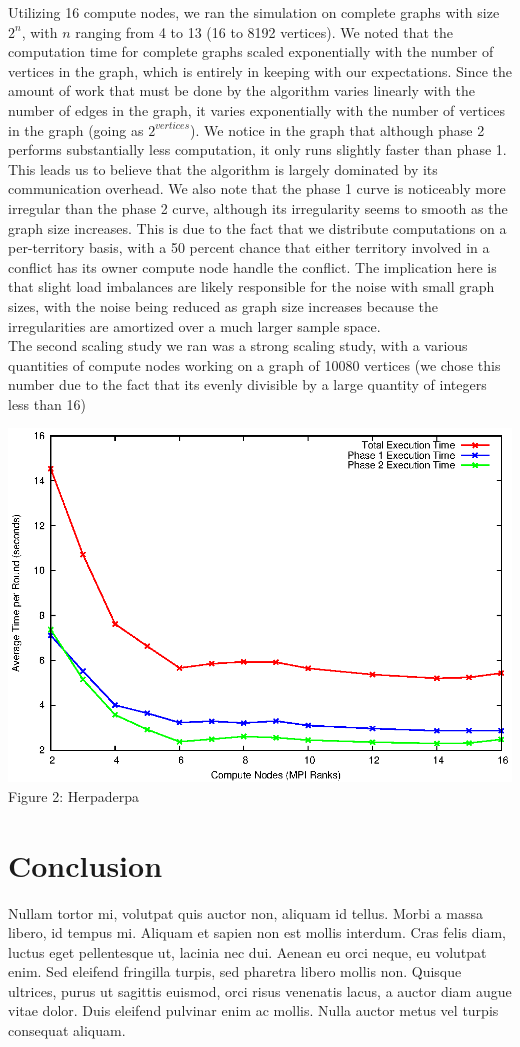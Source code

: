 \documentclass[10pt]{article}
\begin{document}
\begin{multicols}{2}
		Utilizing 16 compute nodes, we ran the simulation on complete graphs with size $2^{n}$, with $n$ ranging from 4 to 13 (16 to 8192 vertices). 
		We noted that the computation time for complete graphs scaled exponentially with the number of vertices in the graph, which is entirely in keeping with our expectations. 
		Since the amount of work that must be done by the algorithm varies linearly with the number of edges in the graph, it varies exponentially with the number of vertices in the graph (going as $2^{vertices}$). 
		We notice in the graph that although phase 2 performs substantially less computation, it only runs slightly faster than phase 1. 
		This leads us to believe that the algorithm is largely dominated by its communication overhead. 
		We also note that the phase 1 curve is noticeably more irregular than the phase 2 curve, although its irregularity seems to smooth as the graph size increases. 
		This is due to the fact that we distribute computations on a per-territory basis, with a 50 percent chance that either territory involved in a conflict has its owner compute node handle the conflict. 
		The implication here is that slight load imbalances are likely responsible for the noise with small graph sizes, with the noise being reduced as graph size increases because the irregularities are amortized over a much larger sample space.
		\\
		The second scaling study we ran was a strong scaling study, with a various quantities of compute nodes working on a graph of 10080 vertices (we chose this number due to the fact that its evenly divisible by a large quantity of integers less than 16)
		\\
		\begin{center}
			\includegraphics[width=.45\textwidth]{ranks.eps}
			\small{Figure 2: Herpaderpa}
		\end{center}
		
				
		\section*{Conclusion}
		Nullam tortor mi, volutpat quis auctor non, aliquam id tellus. Morbi a massa libero, id tempus mi. Aliquam et sapien non est mollis interdum. Cras felis diam, luctus eget pellentesque ut, lacinia nec dui. Aenean eu orci neque, eu volutpat enim. Sed eleifend fringilla turpis, sed pharetra libero mollis non. Quisque ultrices, purus ut sagittis euismod, orci risus venenatis lacus, a auctor diam augue vitae dolor. Duis eleifend pulvinar enim ac mollis. Nulla auctor metus vel turpis consequat aliquam.
		


\end{multicols}
\end{document}
